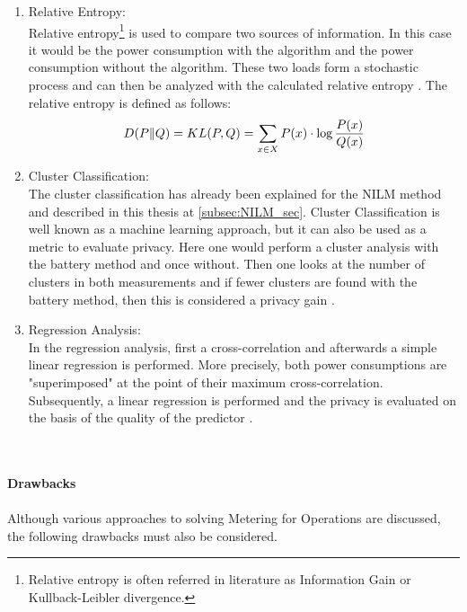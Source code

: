 \begin{enumerate}
\label{subsec:information_gain}
\item Relative Entropy:\\
Relative entropy\footnote[3]{Relative entropy is often referred in literature as Information Gain or Kullback-Leibler divergence.} is used to compare two sources of information. In this case it would be the power consumption with the algorithm and the power consumption without the algorithm. These two loads form a stochastic process and can then be analyzed with the calculated relative entropy \cite{kalogridis2011affordable}. The relative entropy is defined as follows:\\
\begin{equation}
D(P\|Q) = KL(P, Q)= \sum_{x \in X} P(x) \cdot \log {P(x) \over Q(x)}
\end{equation}
\clearpage
\item Cluster Classification:\\
The cluster classification has already been explained for the \gls{NILM} method and described in this thesis at \ref{subsec:NILM_sec}. Cluster Classification is well known as a machine learning approach, but it can also be used as a metric to evaluate privacy. Here one would perform a cluster analysis with the battery method and once without. Then one looks at the number of clusters in both measurements and if fewer clusters are found with the battery method, then this is considered a privacy gain \cite{kalogridis2010privacy}.
\item Regression Analysis:\\
In the regression analysis, first a cross-correlation and afterwards a simple linear regression is performed. More precisely, both power consumptions are "superimposed" at the point of their maximum cross-correlation. Subsequently, a linear regression is performed and the privacy is evaluated on the basis of the quality of the predictor \cite{mclaughlin2011protecting}.
\end{enumerate}
\\
\\
\textbf{Drawbacks}
\\
\\
Although various approaches to solving Metering for Operations are discussed, the following drawbacks must also be considered.
